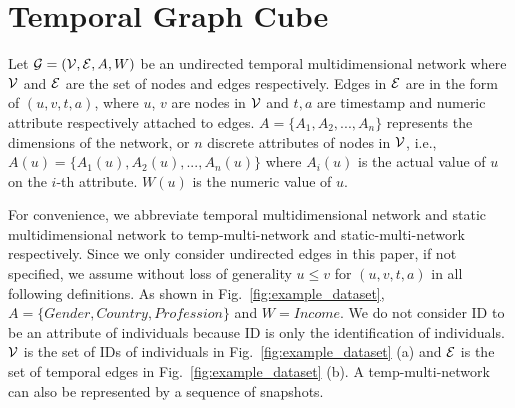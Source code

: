 \documentclass[10pt,journal,compsoc]{IEEEtran}
\begin{document}

\section{Temporal Graph Cube} \label{sec:temp_graph_cube}
\begin{definition}
	\label{def:temp_multi_network}
	Let $\mathcal{G}=(\mathcal{V}, \mathcal{E}, A, W)$ be an undirected temporal multidimensional network where $\mathcal{V}$ and $\mathcal{E}$ are the set of nodes and edges respectively. Edges in $\mathcal{E}$ are in the form of $(u, v, t, a)$, where $u$, $v$ are nodes in $\mathcal{V}$ and $t, a$ are timestamp and numeric attribute respectively attached to edges. $A=\{A_1, A_2, ... , A_n\}$ represents the dimensions of the network, or $n$ discrete attributes of nodes in $ \mathcal{V} $, i.e., $A(u)=\{A_1(u), A_2(u), ... , A_n(u)\}$ where $A_i(u)$ is the actual value of $u$ on the $i$-th attribute. $ W(u) $ is the numeric value of $u$.
\end{definition}

For convenience, we abbreviate temporal multidimensional network and static multidimensional network to temp-multi-network and static-multi-network respectively. Since we only consider undirected edges in this paper, if not specified, we assume without loss of generality $u \leq v$ for $(u, v, t, a)$ in all following definitions. As shown in Fig.~\ref{fig:example_dataset}, $ A=\{Gender,Country,Profession\} $ and $ W=Income $. We do not consider ID to be an attribute of individuals because ID is only the identification of individuals. $ \mathcal{V} $ is the set of IDs of individuals in Fig.~\ref{fig:example_dataset} (a) and $ \mathcal{E} $ is the set of temporal edges in Fig.~\ref{fig:example_dataset} (b). A temp-multi-network can also be represented by a sequence of snapshots.
\end{document}
